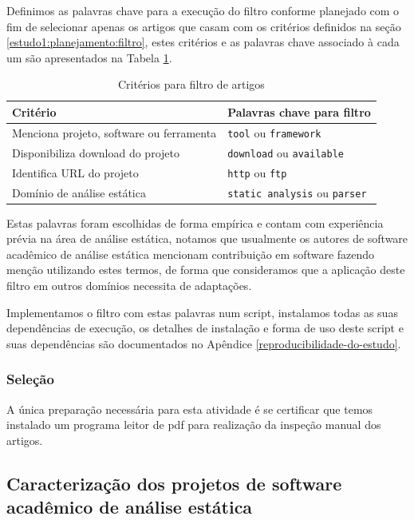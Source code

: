Definimos as palavras chave para a execução do filtro conforme planejado com
o fim de selecionar apenas os artigos que casam com os critérios definidos
na seção \ref{estudo1:planejamento:filtro}, estes critérios e as palavras chave
associado à cada um são apresentados na Tabela \ref{criterios-filtro}.

\begin{table}[h]
\caption{Critérios para filtro de artigos}
\centering
\begin{tabular}{ l l }
  \hline
  Critério                                 & Palavras chave para filtro            \\
  \hline
  Menciona projeto, software ou ferramenta & {\tt tool} ou {\tt framework}         \\
  Disponibiliza download do projeto        & {\tt download} ou {\tt available}     \\
  Identifica URL do projeto                & {\tt http} ou {\tt ftp}               \\
  Domínio de análise estática              & {\tt static analysis} ou {\tt parser} \\
  \hline
\end{tabular}
\label{criterios-filtro}
\end{table}

Estas palavras foram escolhidas de forma empírica e contam com experiência
prévia na área de análise estática, notamos que usualmente os autores de
software acadêmico de análise estática mencionam contribuição em software
fazendo menção utilizando estes termos, de forma que consideramos que a
aplicação deste filtro em outros domínios necessita de adaptações.

Implementamos o filtro com estas palavras num script, instalamos todas as suas
dependências de execução, os detalhes de instalação e forma de uso deste script
e suas dependências são documentados no Apêndice
\ref{reproducibilidade-do-estudo}.

\subsubsection{Seleção}

A única preparação necessária para esta atividade é se certificar que temos
instalado um programa leitor de pdf para realização da inspeção manual dos
artigos.

\subsection{Caracterização dos projetos de software acadêmico de análise estática}

